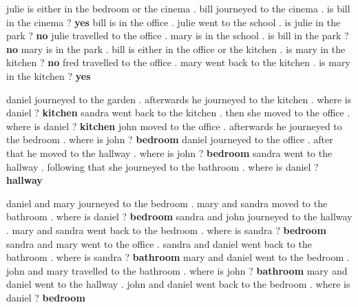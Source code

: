 \begin{table}[htb!]
\begin{tcbraster}[raster columns=2, size=minimal, raster valign=top]
\begin{tcolorbox}[mybox, title=Task 9: Simple negation]
    \end{tcolorbox}  
    \begin{tcolorbox}[mybox, title=Task 10: Indefinite knowledge] 
    \tiny
julie is either in the bedroom or the cinema . bill journeyed to the cinema . is bill in the cinema ? \textbf{yes} bill is in the office . julie went to the school . is julie in the park ? \textbf{no} julie travelled to the office . mary is in the school . is bill in the park ? \textbf{no} mary is in the park . bill is either in the office or the kitchen . is mary in the kitchen ? \textbf{no} fred travelled to the office . mary went back to the kitchen . is mary in the kitchen ? \textbf{yes}
    \end{tcolorbox}  
\end{tcbraster}  




\begin{tcbraster}[raster columns=2, size=minimal, raster valign=top]  
    \begin{tcolorbox}[mybox, title=Task 11: Basic conference]  
    \tiny  
    daniel journeyed to the garden . afterwards he journeyed to the kitchen . where is daniel ? \textbf{kitchen} sandra went back to the kitchen . then she moved to the office . where is daniel ? \textbf{kitchen} john moved to the office . afterwards he journeyed to the bedroom . where is john ? \textbf{bedroom} daniel journeyed to the office . after that he moved to the hallway . where is john ? \textbf{bedroom} sandra went to the hallway . following that she journeyed to the bathroom . where is daniel ? \textbf{hallway } 
    \end{tcolorbox}  
    \begin{tcolorbox}[mybox, title=Task 12: Conjugation]  
    \tiny  
    daniel and mary journeyed to the bedroom . mary and sandra moved to the bathroom . where is daniel ? \textbf{bedroom} sandra and john journeyed to the hallway . mary and sandra went back to the bedroom . where is sandra ? \textbf{bedroom} sandra and mary went to the office . sandra and daniel went back to the bathroom . where is sandra ? \textbf{bathroom} mary and daniel went to the bedroom . john and mary travelled to the bathroom . where is john ? \textbf{bathroom} mary and daniel went to the hallway . john and daniel went back to the bedroom . where is daniel ? \textbf{bedroom}
    \end{tcolorbox}  


\end{tcbraster}
\end{table}
